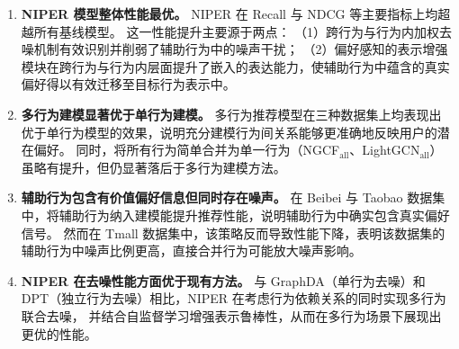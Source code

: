 \begin{enumerate}
    \item \textbf{NIPER 模型整体性能最优。}  
    NIPER 在 Recall 与 NDCG 等主要指标上均超越所有基线模型。  
    这一性能提升主要源于两点：  
    （1）跨行为与行为内加权去噪机制有效识别并削弱了辅助行为中的噪声干扰；  
    （2）偏好感知的表示增强模块在跨行为与行为内层面提升了嵌入的表达能力，使辅助行为中蕴含的真实偏好得以有效迁移至目标行为表示中。

    \item \textbf{多行为建模显著优于单行为建模。}  
    多行为推荐模型在三种数据集上均表现出优于单行为模型的效果，说明充分建模行为间关系能够更准确地反映用户的潜在偏好。  
    同时，将所有行为简单合并为单一行为（NGCF$_{\text{all}}$、LightGCN$_{\text{all}}$）虽略有提升，但仍显著落后于多行为建模方法。

    \item \textbf{辅助行为包含有价值偏好信息但同时存在噪声。}  
    在 Beibei 与 Taobao 数据集中，将辅助行为纳入建模能提升推荐性能，说明辅助行为中确实包含真实偏好信号。  
    然而在 Tmall 数据集中，该策略反而导致性能下降，表明该数据集的辅助行为中噪声比例更高，直接合并行为可能放大噪声影响。

    \item \textbf{NIPER 在去噪性能方面优于现有方法。}  
    与 GraphDA（单行为去噪）和 DPT（独立行为去噪）相比，NIPER 在考虑行为依赖关系的同时实现多行为联合去噪，  
    并结合自监督学习增强表示鲁棒性，从而在多行为场景下展现出更优的性能。
\end{enumerate}



